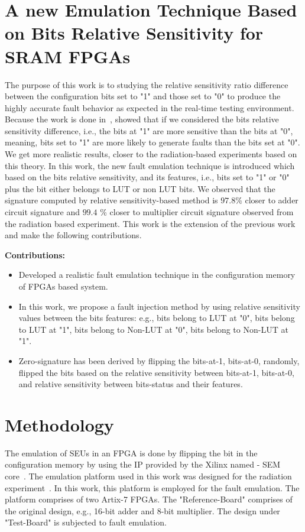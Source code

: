 \section{A new Emulation Technique Based on Bits Relative Sensitivity
for SRAM FPGAs}
\label{intro}

The purpose of this work is to  studying the relative sensitivity ratio difference between the configuration bits set to "1" and those set to "0" to produce the highly accurate fault behavior as expected in the real-time testing environment. Because the work is done in~\citep{souari2016towards}, showed that if we considered the bits relative sensitivity difference, i.e., the bits at "1" are more sensitive than the bits at "0", meaning, bits set to "1" are more likely to generate faults than the bits set at "0". We get more realistic results, closer to the radiation-based experiments based on this theory. 
In this work, the new fault emulation technique is introduced which based on the bits relative sensitivity, and its features, i.e., bits set to "1" or "0" plus the bit either belongs to LUT or non LUT bits.  We observed that the signature computed by relative sensitivity-based method is $97.8$\% closer to adder circuit signature and $99.4$ \% closer to multiplier circuit signature observed from the radiation based experiment.
This work is the extension of the previous work and make the following contributions. 

\textbf{Contributions:} 
\begin{itemize}

\item{Developed a realistic fault emulation technique in the configuration memory
of FPGAs based system}.
\item{In this work, we propose a fault injection method by using relative sensitivity values between the bits features: e.g., bits belong to LUT at "0", bits belong to LUT at "1", bits belong to Non-LUT at "0", bits belong to Non-LUT at "1"}.
\item{Zero-signature has been derived by flipping the bits-at-1, bits-at-0, randomly, flipped the bits based on the relative sensitivity between bits-at-1, bits-at-0, and relative sensitivity between bits-status and their features}.
\end{itemize}


\section{Methodology}
\label{Methodology}
The emulation of SEUs in an FPGA is done by flipping the bit in the configuration memory by using the IP provided by the Xilinx named - SEM core~\citep{xilinx}. The emulation platform used in this work was designed for the radiation experiment~\citep{hobeika2014multi}. In this work, this platform is employed for the fault emulation. The platform comprises of two Artix-7 FPGAs. The "Reference-Board" comprises of the original design, e.g., 16-bit adder and 8-bit multiplier. The design under "Test-Board" is subjected to fault emulation.  

